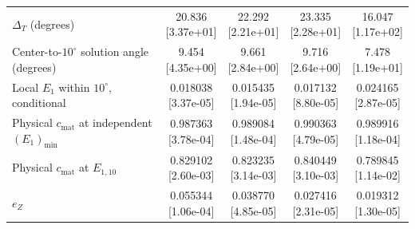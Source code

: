 \documentclass[12pt,letterpaper]{article}
\theoremstyle{plain}
\theoremstyle{definition}
\begin{document}
\begin{table}[p]
\begin{adjustbox}{max width=\linewidth}
\begin{tabular}{@{}lcccc@{}}
$\Delta_T$ (degrees) & \shortstack{20.836\\[-1pt]{\scriptsize[3.37e+01]}} & \shortstack{22.292\\[-1pt]{\scriptsize[2.21e+01]}} & \shortstack{23.335\\[-1pt]{\scriptsize[2.28e+01]}} & \shortstack{16.047\\[-1pt]{\scriptsize[1.17e+02]}}\\
Center-to-$10^\circ$ solution angle (degrees) & \shortstack{9.454\\[-1pt]{\scriptsize[4.35e+00]}} & \shortstack{9.661\\[-1pt]{\scriptsize[2.84e+00]}} & \shortstack{9.716\\[-1pt]{\scriptsize[2.64e+00]}} & \shortstack{7.478\\[-1pt]{\scriptsize[1.19e+01]}}\\
Local $E_1$ within $10^\circ$, conditional & \shortstack{0.018038\\[-1pt]{\scriptsize[3.37e-05]}} & \shortstack{0.015435\\[-1pt]{\scriptsize[1.94e-05]}} & \shortstack{0.017132\\[-1pt]{\scriptsize[8.80e-05]}} & \shortstack{0.024165\\[-1pt]{\scriptsize[2.87e-05]}}\\
Physical $c_{\mathrm{mat}}$ at independent $(E_1)_{\min}$ & \shortstack{0.987363\\[-1pt]{\scriptsize[3.78e-04]}} & \shortstack{0.989084\\[-1pt]{\scriptsize[1.48e-04]}} & \shortstack{0.990363\\[-1pt]{\scriptsize[4.79e-05]}} & \shortstack{0.989916\\[-1pt]{\scriptsize[1.18e-04]}}\\
Physical $c_{\mathrm{mat}}$ at $E_{1,10}$ & \shortstack{0.829102\\[-1pt]{\scriptsize[2.60e-03]}} & \shortstack{0.823235\\[-1pt]{\scriptsize[3.14e-03]}} & \shortstack{0.840449\\[-1pt]{\scriptsize[3.10e-03]}} & \shortstack{0.789845\\[-1pt]{\scriptsize[1.14e-02]}}\\
$e_Z$ & \shortstack{0.055344\\[-1pt]{\scriptsize[1.06e-04]}} & \shortstack{0.038770\\[-1pt]{\scriptsize[4.85e-05]}} & \shortstack{0.027416\\[-1pt]{\scriptsize[2.31e-05]}} & \shortstack{0.019312\\[-1pt]{\scriptsize[1.30e-05]}}\\

\end{tabular}
\end{adjustbox}
\end{table}
\end{document}
